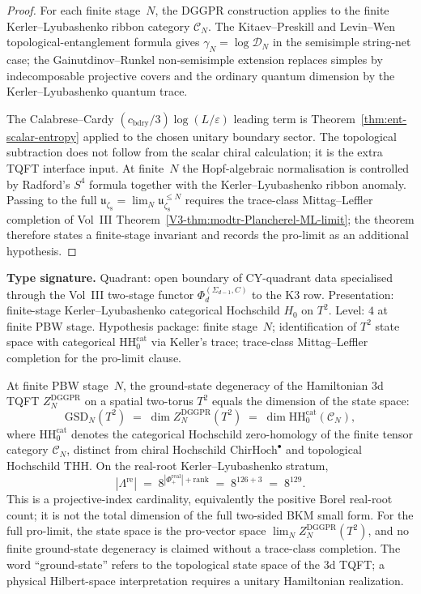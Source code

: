 \begin{proof}
For each finite stage~$N$, the DGGPR construction applies to the
finite Kerler--Lyubashenko ribbon category $\mathcal C_N$.  The
Kitaev--Preskill and Levin--Wen topological-entanglement formula gives
$\gamma_N=\log\mathcal D_N$ in the semisimple string-net case; the
Gainutdinov--Runkel non-semisimple extension replaces simples by
indecomposable projective covers and the ordinary quantum dimension by
the Kerler--Lyubashenko quantum trace.

The Calabrese--Cardy $(c_{\mathrm{bdry}}/3)\log(L/\varepsilon)$
leading term is Theorem~\ref{thm:ent-scalar-entropy} applied to the
chosen unitary boundary sector.  The topological subtraction does not
follow from the scalar chiral calculation; it is the extra TQFT
interface input.  At finite~$N$ the Hopf-algebraic
normalisation is controlled by Radford's $S^4$ formula together with
the Kerler--Lyubashenko ribbon anomaly.  Passing to the full
$\mathfrak u_{\zeta_8}=\lim_N\mathfrak u_{\zeta_8}^{\le N}$ requires
the trace-class Mittag--Leffler completion of Vol~III
Theorem~\ref{V3-thm:modtr-Plancherel-ML-limit}; the theorem therefore
states a finite-stage invariant and records the pro-limit as an
additional hypothesis.
\end{proof}

\begin{theorem}
\label{thm:ent-GSD-T2}
\ClaimStatusConditional
\textbf{Type signature.}  Quadrant: open boundary of CY-quadrant data
specialised through the Vol~III two-stage functor
$\Phi_d^{(\Sigma_{d-1},C)}$ to the K3 row.  Presentation:
finite-stage Kerler--Lyubashenko categorical Hochschild $H_0$ on
$T^2$.  Level: $4$ at finite PBW stage.  Hypothesis package: finite
stage~$N$; identification of $T^2$ state space with categorical
$\mathrm{HH}_0^{\mathrm{cat}}$ via Keller's trace; trace-class
Mittag--Leffler completion for the pro-limit clause.

At finite PBW stage~$N$, the ground-state degeneracy of the
Hamiltonian 3d TQFT $Z_N^{\mathrm{DGGPR}}$ on a spatial two-torus
$T^2$ equals the dimension of the state space:
\[
 \mathrm{GSD}_N(T^2)
 \;=\;
 \dim Z_N^{\mathrm{DGGPR}}(T^2)
 \;=\;
 \dim\mathrm{HH}_0^{\mathrm{cat}}(\mathcal C_N),
\]
where $\mathrm{HH}_0^{\mathrm{cat}}$ denotes the categorical
Hochschild zero-homology of the finite tensor category
$\mathcal C_N$, distinct from chiral Hochschild
$\mathrm{ChirHoch}^\bullet$ and topological Hochschild
$\mathrm{THH}$.  On the real-root Kerler--Lyubashenko stratum,
\[
 |\Lambda^{\mathrm{re}}|
 \;=\;
 8^{|\Phi^{\mathrm{real}}_+|+\mathrm{rank}}
 \;=\;
 8^{126+3}
 \;=\;
 8^{129}.
\]
This is a projective-index cardinality, equivalently the positive
Borel real-root count; it is not the total dimension of the full
two-sided BKM small form.  For the full pro-limit, the state space is
the pro-vector space $\lim_N Z_N^{\mathrm{DGGPR}}(T^2)$, and no finite
ground-state degeneracy is claimed without a trace-class completion.
The word ``ground-state'' refers to the topological state space of the
3d TQFT; a physical Hilbert-space interpretation requires a unitary
Hamiltonian realization.
\end{theorem}

